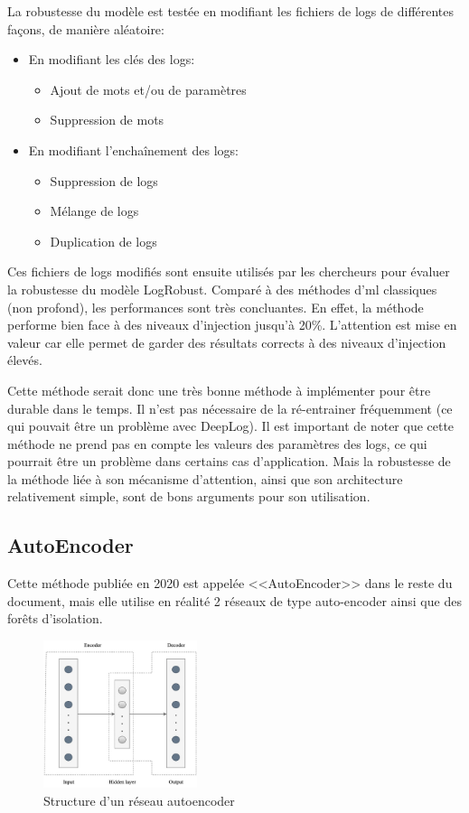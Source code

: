 \documentclass[openany, 11pt]{memoir}
\begin{document}
\bigskip
La robustesse du modèle est testée en modifiant les fichiers de \glspl{log} de différentes façons, de manière aléatoire:

\begin{itemize}
	\item En modifiant les clés des logs:
	\begin{itemize}
		\item Ajout de mots et/ou de paramètres
		\item Suppression de mots
	\end{itemize}
	\item En modifiant l'enchaînement des logs:
	\begin{itemize}
		\item Suppression de logs
		\item Mélange de logs
		\item Duplication de logs
	\end{itemize}
\end{itemize}

Ces fichiers de \glspl{log} modifiés sont ensuite utilisés par les chercheurs pour évaluer la robustesse du modèle LogRobust. Comparé à des méthodes d'\gls{ml} classiques (non profond), les performances sont très concluantes. En effet, la méthode performe bien face à des niveaux d'injection jusqu'à 20\%. L'attention est mise en valeur car elle permet de garder des résultats corrects à des niveaux d'injection élevés.

\bigskip
Cette méthode serait donc une très bonne méthode à implémenter pour être durable dans le temps. Il n'est pas nécessaire de la ré-entrainer fréquemment (ce qui pouvait être un problème avec DeepLog). Il est important de noter que cette méthode ne prend pas en compte les valeurs des paramètres des \glspl{log}, ce qui pourrait être un problème dans certains cas d'application. Mais la robustesse de la méthode liée à son mécanisme d'attention, ainsi que son architecture relativement simple, sont de bons arguments pour son utilisation.

\subsection{AutoEncoder}

Cette méthode publiée en 2020 \cite{autoencoder} est appelée <<AutoEncoder>> dans le reste du document, mais elle utilise en réalité 2 réseaux de type auto-encoder ainsi que des forêts d'isolation.

\begin{figure}[ht]
	\centering
	\includegraphics[width=0.4\textwidth]{images/autoencoder.png}
	\caption{Structure d'un réseau autoencoder}
	\label{autoencoder}
\end{figure}
\end{document}
